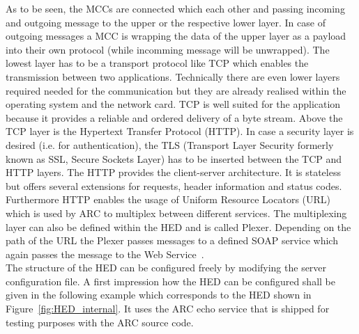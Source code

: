 As to be seen, the MCCs are connected which each other and passing incoming and outgoing message to the upper or the respective lower layer. In case of outgoing messages a MCC is wrapping the data of the upper layer as a payload into their own protocol (while incomming message will be unwrapped).
The lowest layer has to be a transport protocol like TCP which enables the transmission between two applications.
Technically there are even lower layers required needed for the communication but they are already realised within the operating system and the  network card.
TCP is well suited for the application because it provides a reliable and ordered delivery of a byte stream.
Above the TCP layer is the Hypertext Transfer Protocol (HTTP). 
In case a security layer is desired (i.e. for authentication), the TLS (Transport Layer Security formerly known as SSL, Secure Sockets Layer) has to be inserted between the TCP and HTTP layers.
The HTTP provides the client-server architecture. It is stateless but offers several extensions for requests, header information and status codes. Furthermore HTTP enables the usage of Uniform Resource Locators (URL) which is used by ARC to multiplex between different services. The multiplexing layer can also be defined within the HED and is called Plexer.
Depending on the path of the URL the Plexer passes messages to a defined SOAP service which again passes the message to the Web Service~\cite{QIANG_2005}.\\


The structure of the HED can be configured freely by modifying the server configuration file.
A first impression how the HED can be configured shall be given in the following example which corresponds to the HED shown in Figure~\ref{fig:HED_internal}.
It uses the ARC echo service that is shipped for testing purposes with the ARC source code.



